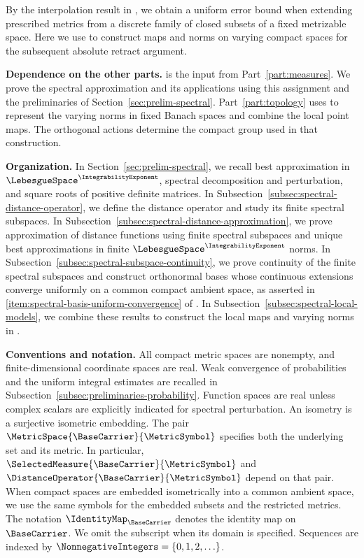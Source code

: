 By the interpolation result in
\cite[Theorem~1.1]{Ishiki2026Interpolation},
we obtain a uniform error bound when extending prescribed metrics from a
discrete family of closed subsets of a fixed metrizable space.
Here we use  to construct maps and norms on varying
compact spaces for the subsequent absolute retract argument.

\medskip
\noindent\textbf{Dependence on the other parts.}
 is the input from Part~\ref{part:measures}.
We prove the spectral approximation and its applications using this
assignment and the preliminaries of Section~\ref{sec:prelim-spectral}.
Part~\ref{part:topology} uses  to represent the varying
norms in fixed Banach spaces and combine the local point maps.
The orthogonal actions determine the compact group used in that construction.

\medskip
\noindent\textbf{Organization.}
In Section~\ref{sec:prelim-spectral},
we recall best approximation in
$\LebesgueSpace^\IntegrabilityExponent$,
spectral decomposition and perturbation,
and square roots of positive definite matrices.
In Subsection~\ref{subsec:spectral-distance-operator},
we define the distance operator and study its finite
spectral subspaces.
In Subsection~\ref{subsec:spectral-distance-approximation},
we prove approximation of distance functions using finite
spectral subspaces and unique best approximations in finite
$\LebesgueSpace^\IntegrabilityExponent$
norms.
In Subsection~\ref{subsec:spectral-subspace-continuity},
we prove continuity of the finite spectral subspaces
and construct orthonormal bases whose continuous extensions converge uniformly
on a common compact ambient space,
as asserted in \ref{item:spectral-basis-uniform-convergence}
of .
In Subsection~\ref{subsec:spectral-local-models},
we combine these results to construct the local maps and
varying norms in .

\medskip
\noindent\textbf{Conventions and notation.}
All compact metric spaces are nonempty,
and finite-dimensional coordinate spaces are real.
Weak convergence of probabilities and the uniform integral estimates are
recalled in Subsection~\ref{subsec:preliminaries-probability}.
Function spaces are real unless complex scalars are explicitly indicated
for spectral perturbation.
An isometry is a surjective isometric embedding.
The pair
$\MetricSpace{\BaseCarrier}{\MetricSymbol}$
specifies both the underlying set and its metric.
In particular,
$\SelectedMeasure{\BaseCarrier}{\MetricSymbol}$
and
$\DistanceOperator{\BaseCarrier}{\MetricSymbol}$
depend on that pair.
When compact spaces are embedded isometrically into a common ambient
space,
we use the same symbols for the embedded subsets and the restricted
metrics.
The notation
$\IdentityMap_\BaseCarrier$
denotes the identity map on
$\BaseCarrier$.
We omit the subscript when its domain is specified.
Sequences are indexed by
$\NonnegativeIntegers=\{0,1,2,\ldots\}$.
